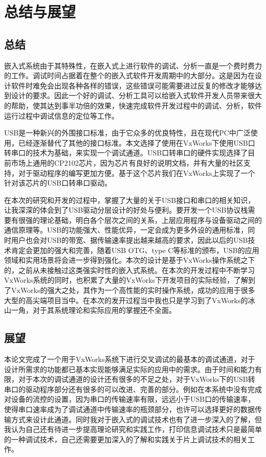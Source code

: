 \chapter{总结与展望}

\section{总结}
	
	嵌入式系统由于其特殊性，在嵌入式上进行软件的调试、分析一直是一个费时费力的工作。调试时间占据着在整个的嵌入式软件开发周期中的大部分。这是因为在设计软件时难免会出现各种各样的错误，这些错误可能需要进过反复的修改才能够达到设计的要求。因此一个好的调试、分析工具可以给嵌入式软件开发人员带来很大的帮助，使其达到事半功倍的效果，快速完成软件开发过程中的调试、分析，软件运行过程中调试信息的定位等工作。
	
	USB是一种新兴的外围接口标准，由于它众多的优良特性，且在现代PC中广泛使用，已经逐渐替代了其他的接口标准。本文选择了使用在VxWorks下使用USB口转串口的技术为基础，来实现一个调试通道。USB口转串口的硬件实现选择了目前市场上通用的CP2102芯片，因为芯片有良好的说明文档，并有大量的社区支持，对于驱动程序的编写更加方便。基于这个芯片我们在VxWorks上实现了一个针对该芯片的USB口转串口驱动。
	
	在本次的研究和开发的过程中，掌握了大量的关于USB接口和串口的相关知识，让我深深的体会到了USB驱动分层设计的好处与便利。要开发一个USB协议栈需要有很强的理论基础，明白各个层次之间的关系，上层应用程序与设备驱动之间的通信原理等。USB的功能强大、性能优异，一定会成为更多外设的通用标准，同时用户也会对USB的带宽、据传输速率提出越来越高的要求，因此以后的USB技术肯定会更加的强大和完善，随着USB OTG、type C等标准的颁布，USB的应用领域和实用场景将会进一步得到强化。本次的设计是基于VxWorks操作系统之下的，之前从未接触过这类强实时性的嵌入式系统。在本次的开发过程中不断学习VxWorks系统的同时，也积累了大量的VxWorks下开发项目的实际经验，了解到了VxWorks的强大之处，其作为一个高性能的实时操作系统，成功的应用于很多大型的高尖端项目当中。在本次的发开过程当中我也只是学习到了VxWorks的冰山一角，对于其系统理论和实际应用的掌握还不全面。	
	
	\section{展望}
	
	本论文完成了一个用于VxWorks系统下进行交叉调试的最基本的调试通道，对于设计所需求的功能都已基本实现能够满足实际的应用中的需求。由于时间和能力有限，对于本次的调试通道的设计还有很多的不足之处，对于VxWorks下的USB转串口的驱动程序部分还有很多的可以改进、完善的部分。例如在本系统中没有完成对设备的流控的设置，因为串口的传输速率有限，远远小于USB口的传输速率，使得串口速率成为了调试通道中传输速率的瓶颈部分，也许可以选择更好的数据传输方式来设计此通道。同时我对于嵌入式的调试技术也有了进一步深入的了解，但我认为自己还有待进一步提高理论研究和实践工作，打印信息调试技术只是最简单的一种调试技术，自己还需要更加深入的了解和实践关于片上调试技术的相关工作。
	